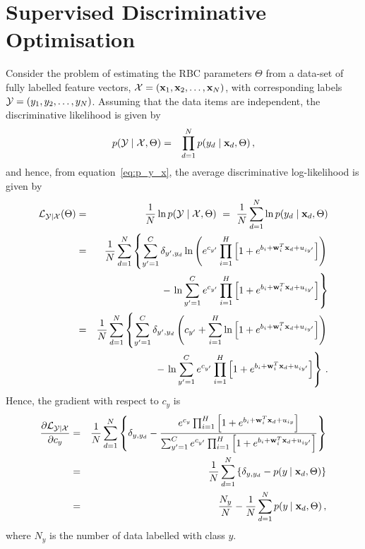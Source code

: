 \documentclass[a4paper]{article}
\renewcommand{\v}[1]{\mathbf{#1}}
\renewcommand{\c}[1]{{\cal #1}}
\begin{document}
\section{Supervised Discriminative Optimisation}
Consider the problem of estimating the RBC parameters $\Theta$ from a data-set of fully labelled feature vectors,
$\c{X}=(\v{x}_1,\v{x}_2,\ldots,\v{x}_N)$, with corresponding labels $\c{Y}=(y_1,y_2,\ldots,y_N)$.
Assuming that the data items are independent, the discriminative likelihood is given by
\begin{eqnarray}
  p(\c{Y}\;|\;\c{X},\Theta) & = & \prod_{d=1}^N p(y_d\;|\;\v{x}_d,\Theta)
\,,
\end{eqnarray}
 and hence, from equation~\eqref{eq:p_y_x}, the average discriminative log-likelihood is given by
\begin{eqnarray}
  \c{L}_{\c{Y}|\c{X}}(\Theta) & = & \frac{1}{N}\ln p(\c{Y}\;|\;\c{X},\Theta)
~=~ 
\frac{1}{N}\sum_{d=1}^N \ln p(y_d\;|\;\v{x}_d,\Theta)
\nonumber\\& = & 
\frac{1}{N}\sum_{d=1}^N\left\{
  \sum_{y'=1}^C \delta_{y',y_d}\ln\left(
   e^{c_{y'}}\prod_{i=1}^{H}\left[1+e^{b_i+ \v{w}_i^T\v{x}_d+u_{iy'}}\right]\right)\right.
\nonumber\\&&
{}-\left.\ln\sum_{y'=1}^{C} 
e^{c_{y'}}\prod_{i=1}^{H}\left[1+e^{b_i+ \v{w}_i^T\v{x}_d+u_{iy'}}\right]
\right\}
\nonumber\\& = & 
\frac{1}{N}\sum_{d=1}^N\left\{
  \sum_{y'=1}^C \delta_{y',y_d}\left(
   c_{y'}+\sum_{i=1}^{H}\ln\left[1+e^{b_i+ \v{w}_i^T\v{x}_d+u_{iy'}}\right]\right)\right.
\nonumber\\&&
{}-\left.\ln\sum_{y'=1}^{C} 
e^{c_{y'}}\prod_{i=1}^{H}\left[1+e^{b_i+ \v{w}_i^T\v{x}_d+u_{iy'}}\right]
\right\}\,.
\end{eqnarray}
Hence, the gradient with respect to $c_y$ is
\begin{eqnarray}
\frac{\partial\c{L}_{\c{Y}|\c{X}}}{\partial c_y}
& = & 
\frac{1}{N}\sum_{d=1}^N\left\{
\delta_{y,y_d}-
\frac{e^{c_{y}}\prod_{i=1}^{H}\left[1+e^{b_i+ \v{w}_i^T\v{x}_d+u_{iy}}\right]}
{\sum_{y'=1}^{C} 
e^{c_{y'}}\prod_{i=1}^{H}\left[1+e^{b_i+ \v{w}_i^T\v{x}_d+u_{iy'}}\right]}
\right\}
\nonumber\\&=&
\frac{1}{N}\sum_{d=1}^N\left\{
\delta_{y,y_d}-p(y\:|\;\v{x}_d,\Theta)
\right\}
\nonumber\\&=&
\frac{N_y}{N}-\frac{1}{N}\sum_{d=1}^N p(y\:|\;\v{x}_d,\Theta)
\,,
\end{eqnarray}
where $N_y$ is the number of data labelled with class $y$.
\end{document}
